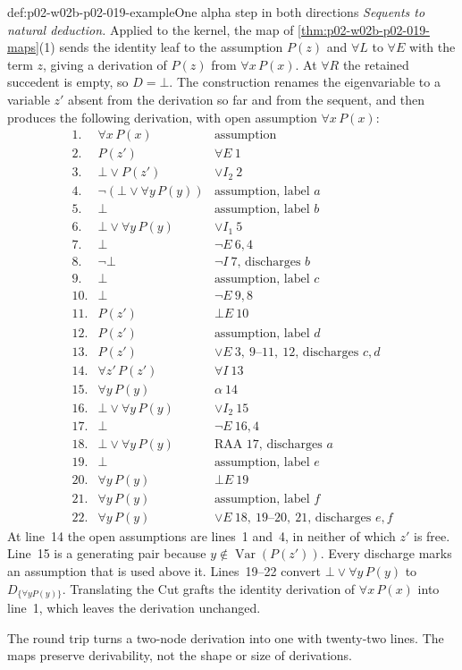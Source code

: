 \begin{hbexample}{def:p02-w02b-p02-019-example}{One alpha step in both directions}
\emph{Sequents to natural deduction.}  Applied to the kernel, the map of
\cref{thm:p02-w02b-p02-019-maps}(1) sends the identity leaf to the
assumption \(P(z)\) and \(\forall L\) to \(\forall E\) with the term \(z\),
giving a derivation of \(P(z)\) from \(\forall x\,P(x)\).  At \(\forall R\)
the retained succedent is empty, so \(D=\bot\).  The construction renames
the eigenvariable to a variable \(z'\) absent from the derivation so far and
from the sequent, and then produces the following derivation, with open
assumption \(\forall x\,P(x)\):
\[
\begin{array}{rll}
 1.&\forall x\,P(x)&\text{assumption}\\
 2.&P(z')&\forall E\ 1\\
 3.&\bot\lor P(z')&\lor I_2\ 2\\
 4.&\neg(\bot\lor\forall y\,P(y))&\text{assumption, label }a\\
 5.&\bot&\text{assumption, label }b\\
 6.&\bot\lor\forall y\,P(y)&\lor I_1\ 5\\
 7.&\bot&\neg E\ 6,4\\
 8.&\neg\bot&\neg I\ 7\text{, discharges }b\\
 9.&\bot&\text{assumption, label }c\\
 10.&\bot&\neg E\ 9,8\\
 11.&P(z')&\bot E\ 10\\
 12.&P(z')&\text{assumption, label }d\\
 13.&P(z')&\lor E\ 3,\ 9\text{--}11,\ 12\text{, discharges }c,d\\
 14.&\forall z'\,P(z')&\forall I\ 13\\
 15.&\forall y\,P(y)&\alpha\ 14\\
 16.&\bot\lor\forall y\,P(y)&\lor I_2\ 15\\
 17.&\bot&\neg E\ 16,4\\
 18.&\bot\lor\forall y\,P(y)&\text{RAA }17\text{, discharges }a\\
 19.&\bot&\text{assumption, label }e\\
 20.&\forall y\,P(y)&\bot E\ 19\\
 21.&\forall y\,P(y)&\text{assumption, label }f\\
 22.&\forall y\,P(y)&\lor E\ 18,\ 19\text{--}20,\ 21\text{, discharges }e,f
\end{array}
\]
At line~14 the open assumptions are lines~1 and~4, in neither of which
\(z'\) is free.  Line~15 is a generating pair because
\(y\notin\operatorname{Var}(P(z'))\).  Every discharge marks an assumption
that is used above it.  Lines~19--22 convert \(\bot\lor\forall y\,P(y)\) to
\(D_{\{\forall y P(y)\}}\).  Translating the Cut grafts the identity
derivation of \(\forall x\,P(x)\) into line~1, which leaves the derivation
unchanged.

The round trip turns a two-node derivation into one with twenty-two lines.
The maps preserve derivability, not the shape or size of derivations.
\end{hbexample}

